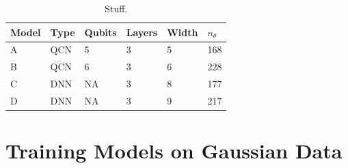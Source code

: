 \begin{table}[H]
\centering
\begin{tabular}{|l|l|l|l|l|l|}
\hline
Model &Type & Qubits& Layers & Width &$n_{\theta}$ \\ \hline
A    & QCN & 5 &  3 & 5& 168   \\ \hline
B    & QCN & 6 &  3 & 6& 228 \\ \hline
C    & DNN & NA&  3 & 8& 177  \\ \hline
D    & DNN & NA&  3 & 9& 217  \\ \hline
\end{tabular}
\caption{Stuff.} 
\label{tab:TL models}
\end{table}



\section{Training Models on Gaussian Data}\label{sec:Training Models}

